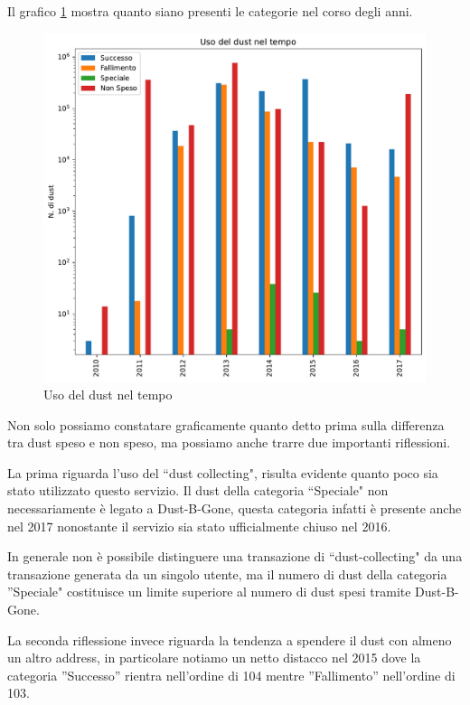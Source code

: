 Il grafico \ref{fig:dust_year} mostra quanto siano presenti le categorie nel corso degli anni.
\begin{figure}[h!]
    \centering
    \includegraphics[scale=0.6]{Grafici/uso_del_dust_new.pdf}
    \caption{Uso del dust nel tempo}
    \label{fig:dust_year}
\end{figure}
\FloatBarrier
Non solo possiamo constatare graficamente quanto detto prima sulla differenza tra dust speso e non speso, ma possiamo anche trarre due importanti riflessioni. 

La prima riguarda l'uso del ``dust collecting", risulta evidente quanto poco sia stato utilizzato questo servizio. Il dust della categoria ``Speciale" non necessariamente è legato a Dust-B-Gone, questa categoria infatti è presente anche nel 2017 nonostante il servizio sia stato ufficialmente chiuso nel 2016. 

In generale non è possibile distinguere una transazione di ``dust-collecting" da una transazione generata da un singolo utente, ma il numero di dust della categoria ''Speciale" costituisce un limite superiore al numero di dust spesi tramite Dust-B-Gone.

La seconda riflessione invece riguarda la tendenza a spendere il dust con almeno un altro address, in particolare notiamo un netto distacco nel 2015 dove la categoria ”Successo” rientra nell’ordine di 104 mentre ”Fallimento” nell’ordine di 103.   

